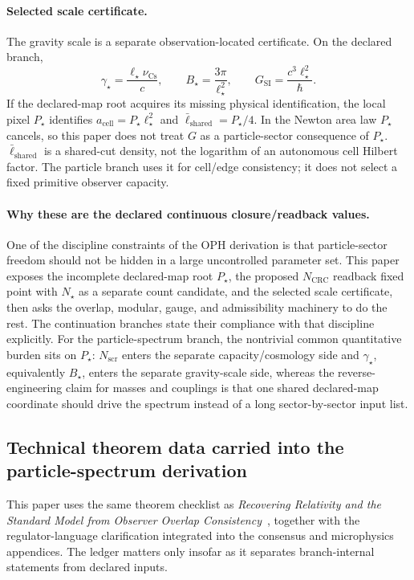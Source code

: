 \documentclass[11pt]{article}
\newcommand{\ellbar}{\bar{\ell}}
\begin{document}
\paragraph{Selected scale certificate.}
The gravity scale is a separate observation-located certificate. On the declared branch,
\[
\gamma_\star=\frac{\ell_\star\nu_{\mathrm{Cs}}}{c},
\qquad
B_\star=\frac{3\pi}{\ell_\star^2},
\qquad
G_{\mathrm{SI}}=\frac{c^3\ell_\star^2}{\hbar}.
\]
If the declared-map root acquires its missing physical identification, the local pixel
\(P_\star\) identifies \(a_{\mathrm{cell}}=P_\star\ell_\star^2\) and
\(\ellbar_{\mathrm{shared}}=P_\star/4\). In the Newton area law \(P_\star\) cancels, so this paper
does not treat \(G\) as a particle-sector consequence of \(P_\star\).
\(\ellbar_{\mathrm{shared}}\) is a shared-cut density, not the logarithm of an autonomous cell
Hilbert factor. The particle branch uses it for cell/edge consistency; it does not select a fixed
primitive observer capacity.

\paragraph{Why these are the declared continuous closure/readback values.}
One of the discipline constraints of the OPH derivation is that particle-sector freedom should not
be hidden in a large uncontrolled parameter set. This paper exposes the incomplete declared-map
root \(P_\star\), the proposed \(N_{\mathrm{CRC}}\) readback fixed point with \(N_\star\) as a
separate count candidate, and the
selected scale certificate, then asks
the overlap, modular, gauge, and admissibility machinery to do the rest. The continuation branches
state their compliance with that discipline explicitly. For the particle-spectrum branch, the nontrivial
common quantitative burden sits on \(P_\star\): \(N_{\mathrm{scr}}\) enters the separate
capacity/cosmology side and \(\gamma_\star\), equivalently \(B_\star\), enters the separate
gravity-scale side, whereas the
reverse-engineering claim for masses and couplings is that one shared declared-map coordinate should
drive the spectrum instead of a long sector-by-sector input list.

\subsection{Technical theorem data carried into the particle-spectrum derivation}

This paper uses the same theorem checklist as
\emph{Recovering Relativity and the Standard Model from Observer Overlap Consistency}~\cite{ophcompact}, together with
the regulator-language clarification integrated into the consensus and microphysics
appendices. The ledger matters only
insofar as it separates branch-internal statements from declared inputs.
\end{document}
